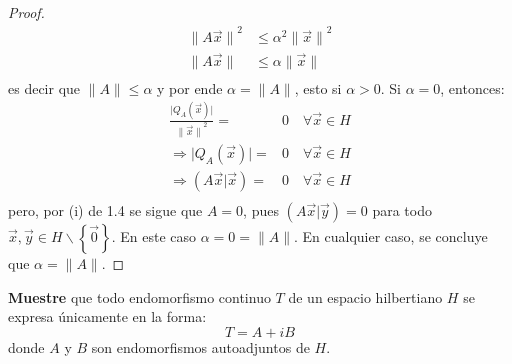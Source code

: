 \documentclass[12pt]{report}
\theoremstyle{largebreak}
\newcommand\abs[1]{\ensuremath{\big|#1\big|}}
\newcommand\pint[2]{\ensuremath{\left(#1\big|#2\right)}}
\newcommand\norm[1]{\ensuremath{\|#1\|}}
\begin{document}
\begin{proof}
        \begin{equation*}
            \begin{split}
                \norm{A\vec{x}}^2&\leq\alpha^2\norm{\vec{x}}^2 \\
                \norm{A\vec{x}}&\leq\alpha\norm{\vec{x}}\\
            \end{split}
        \end{equation*}
        es decir que $\norm{A}\leq\alpha$ y por ende $\alpha=\norm{A}$, esto si $\alpha>0$. Si $\alpha=0$, entonces:
        \begin{equation*}
            \begin{split}
                \frac{\abs{Q_A(\vec{x})}}{\norm{\vec{x}}^2}=&0\quad\forall\vec{x}\in H\\
                \Rightarrow \abs{Q_A(\vec{x})}=&0\quad\forall\vec{x}\in H\\
                \Rightarrow \pint{A\vec{x}}{\vec{x}}=&0\quad\forall\vec{x}\in H\\
            \end{split}
        \end{equation*}
        pero, por (i) de 1.4 se sigue que $A=0$, pues $\pint{A\vec{x}}{\vec{y}}=0$ para todo $\vec{x},\vec{y}\in H\backslash\left\{\vec{0} \right\}$. En este caso $\alpha=0=\norm{A}$. En cualquier caso, se concluye que $\alpha=\norm{A}$.
    \end{proof}

    \begin{excer}
        \textbf{Muestre} que todo endomorfismo continuo $T$ de un espacio hilbertiano $H$ se expresa únicamente en la forma:
        \begin{equation*}
            T=A+iB
        \end{equation*}
        donde $A$ y $B$ son endomorfismos autoadjuntos de $H$.
    \end{excer}
\end{document}
